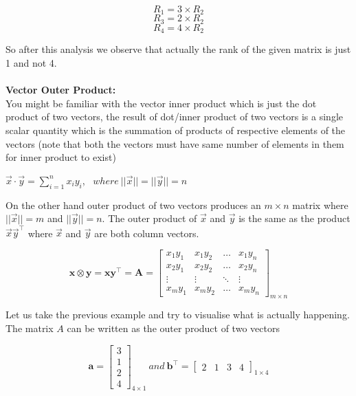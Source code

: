 \documentclass{article}
\begin{document}
\begin{equation}
    R_{1} = 3 \times R_{2}
\end{equation}
\begin{equation}
    R_{3} = 2 \times R_{2}
\end{equation}
\begin{equation}
    R_{4} = 4 \times R_{2}
\end{equation}

So after this analysis we observe that actually the rank of the given matrix is just 1 and not 4. \\ \\

\textbf{Vector Outer Product:} \\
You might be familiar with the vector inner product which is just the dot product of two vectors, the result of dot/inner product of two vectors is a single scalar quantity which is the summation of products of respective elements of the vectors (note that both the vectors must have same number of elements in them for inner product to exist) \\

\begin{center}
    $\vec{x}\cdot\vec{y} = \sum_{i=1}^{n} x_{i}y_{i}$, \
    $ where \ ||\vec{x}|| = ||\vec{y}|| = n$
\end{center}

On the other hand outer product of two vectors produces an $m \times n$ matrix where $||\vec{x}|| = m$ and $||\vec{y}|| = n$. The outer product of $\vec{x}$ and $\vec{y}$ is the same as the product $\vec{x}\vec{y}^{\top}$ where $\vec{x}$ and $\vec{y}$ are both column vectors.

$$
{\displaystyle 
    \mathbf {x} \otimes \mathbf {y} =\mathbf{x}\mathbf{y^{\top}} =\mathbf {A} =
    {\begin{bmatrix} 
        x_{1}y_{1} & x_{1}y_{2} & \dots & x_{1}y_{n} \\ 
        x_{2}y_{1} & x_{2}y_{2} & \dots & x_{2}y_{n} \\ 
        \vdots & \vdots & \ddots & \vdots \\ 
        x_{m}y_{1} & x_{m}y_{2} & \dots & x_{m}y_{n}
    \end{bmatrix}_{m \times n}}
}
$$

Let us take the previous example and try to visualise what is actually happening. \\
The matrix $A$ can be written as the outer product of two vectors

$$
\mathbf{a} = {
\begin{bmatrix}
    3 \\
    1 \\
    2 \\
    4
\end{bmatrix}_{4 \times 1}
} \ and \
\mathbf{b^{\top}} = {
\begin{bmatrix}
    2 & 1 & 3 & 4
\end{bmatrix}_{1 \times 4}
}
$$
\end{document}
